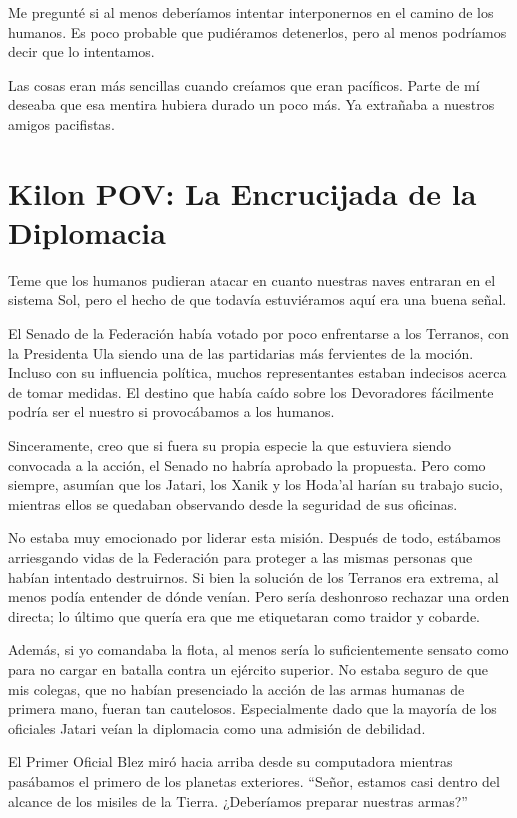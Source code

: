 \documentclass[spanish,12pt,a4paper,oneside,titlepage]{book}
\begin{document}
    Me pregunté si al menos deberíamos intentar interponernos en el camino de los humanos. Es poco probable que pudiéramos detenerlos, pero al menos podríamos decir que lo intentamos.

    Las cosas eran más sencillas cuando creíamos que eran pacíficos. Parte de mí deseaba que esa mentira hubiera durado un poco más. Ya extrañaba a nuestros amigos pacifistas.

    \chapter{Kilon POV: La Encrucijada de la Diplomacia}

    Teme que los humanos pudieran atacar en cuanto nuestras naves entraran en el sistema Sol, pero el hecho de que todavía estuviéramos aquí era una buena señal.

    El Senado de la Federación había votado por poco enfrentarse a los Terranos, con la Presidenta Ula siendo una de las partidarias más fervientes de la moción. Incluso con su influencia política, muchos representantes estaban indecisos acerca de tomar medidas. El destino que había caído sobre los Devoradores fácilmente podría ser el nuestro si provocábamos a los humanos.

    Sinceramente, creo que si fuera su propia especie la que estuviera siendo convocada a la acción, el Senado no habría aprobado la propuesta. Pero como siempre, asumían que los Jatari, los Xanik y los Hoda’al harían su trabajo sucio, mientras ellos se quedaban observando desde la seguridad de sus oficinas.

    No estaba muy emocionado por liderar esta misión. Después de todo, estábamos arriesgando vidas de la Federación para proteger a las mismas personas que habían intentado destruirnos. Si bien la solución de los Terranos era extrema, al menos podía entender de dónde venían. Pero sería deshonroso rechazar una orden directa; lo último que quería era que me etiquetaran como traidor y cobarde.

    Además, si yo comandaba la flota, al menos sería lo suficientemente sensato como para no cargar en batalla contra un ejército superior. No estaba seguro de que mis colegas, que no habían presenciado la acción de las armas humanas de primera mano, fueran tan cautelosos. Especialmente dado que la mayoría de los oficiales Jatari veían la diplomacia como una admisión de debilidad.

    El Primer Oficial Blez miró hacia arriba desde su computadora mientras pasábamos el primero de los planetas exteriores. “Señor, estamos casi dentro del alcance de los misiles de la Tierra. ¿Deberíamos preparar nuestras armas?”
\end{document}
